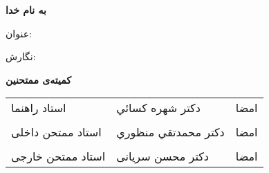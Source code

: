 \pagestyle{empty}
\setlength{\marginparwidth}{0pt}
\setlength{\marginparsep}{0pt}

\begin{large}
\begin{center}

{\large\bf به نام خدا}

\ThesisUniversity

\vspace{-0.1cm}
\ThesisDepartment

\vspace{2.5em}
\textbf{\large\ThesisType}

\end{center}

\vspace{3em}

{\large عنوان: \ThesisTitle}

\vspace{.3em}

{\large نگارش: \ThesisAuthor}

\vspace{1.5cm}

\textbf{کمیته‌ی ممتحنین}

\vspace{1em}

\begin{table}[h]
\large
\begin{tabularx}{\textwidth}{XXX}
‫استاد راهنما       & دكتر شهره كسائي & امضا \\ \\
‫استاد ممتحن داخلی & دكتر محمدتقي منظوري & امضا \\ \\
‫استاد ممتحن خارجی & دکتر محسن سریانی   & امضا
\end{tabularx}
\end{table}

\end{large}

\newpage
